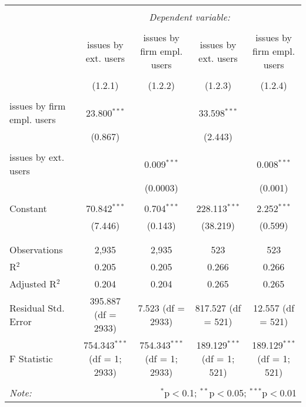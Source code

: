 
\begin{tabular}{@{\extracolsep{5pt}}lcccc}
\\[-1.8ex]\hline
\hline \\[-1.8ex]
 & \multicolumn{4}{c}{\textit{Dependent variable:}} \\
\cline{2-5}
\\[-1.8ex] & issues by ext. users & issues by firm empl. users & issues by ext. users & issues by firm empl. users \\
\\[-1.8ex] & (1.2.1) & (1.2.2) & (1.2.3) & (1.2.4)\\
\hline \\[-1.8ex]
 issues by firm empl. users & 23.800$^{***}$ &  & 33.598$^{***}$ &  \\
  & (0.867) &  & (2.443) &  \\
  & & & & \\
 issues by ext. users &  & 0.009$^{***}$ &  & 0.008$^{***}$ \\
  &  & (0.0003) &  & (0.001) \\
  & & & & \\
 Constant & 70.842$^{***}$ & 0.704$^{***}$ & 228.113$^{***}$ & 2.252$^{***}$ \\
  & (7.446) & (0.143) & (38.219) & (0.599) \\
  & & & & \\
\hline \\[-1.8ex]
Observations & 2,935 & 2,935 & 523 & 523 \\
R$^{2}$ & 0.205 & 0.205 & 0.266 & 0.266 \\
Adjusted R$^{2}$ & 0.204 & 0.204 & 0.265 & 0.265 \\
Residual Std. Error & 395.887 (df = 2933) & 7.523 (df = 2933) & 817.527 (df = 521) & 12.557 (df = 521) \\
F Statistic & 754.343$^{***}$ (df = 1; 2933) & 754.343$^{***}$ (df = 1; 2933) & 189.129$^{***}$ (df = 1; 521) & 189.129$^{***}$ (df = 1; 521) \\
\hline
\hline \\[-1.8ex]
\textit{Note:}  & \multicolumn{4}{r}{$^{*}$p$<$0.1; $^{**}$p$<$0.05; $^{***}$p$<$0.01} \\
\end{tabular}
